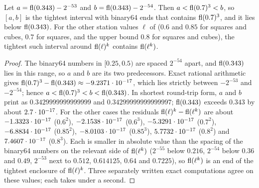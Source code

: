 \begin{lemma}\label{lem:scip-cube}
Let $a=\operatorname{fl}(0.343)-2^{-53}$ and $b=\operatorname{fl}(0.343)-2^{-54}$.
Then $a<\operatorname{fl}(0.7)^3<b$, so $[a,b]$ is the tightest interval with binary64 ends that contains $\operatorname{fl}(0.7)^3$, and it lies below $\operatorname{fl}(0.343)$.
For the other station values $\ell$ of  ($0.6$ and $0.85$ for squares and cubes, $0.7$ for squares, and the upper bound $0.8$ for squares and cubes), the tightest such interval around $\operatorname{fl}(\ell)^k$ contains $\operatorname{fl}(\ell^k)$.
\end{lemma}

\begin{proof}
The binary64 numbers in $[0.25,0.5)$ are spaced $2^{-54}$ apart, and $\operatorname{fl}(0.343)$ lies in this range, so $a$ and $b$ are its two predecessors.
Exact rational arithmetic gives $\operatorname{fl}(0.7)^3-\operatorname{fl}(0.343)\approx-9.2371\cdot 10^{-17}$, which lies strictly between $-2^{-53}$ and $-2^{-54}$; hence $a<\operatorname{fl}(0.7)^3<b<\operatorname{fl}(0.343)$.
In shortest round-trip form, $a$ and $b$ print as $0.3429999999999999$ and $0.34299999999999997$; $\operatorname{fl}(0.343)$ exceeds $0.343$ by about $2.7\cdot 10^{-17}$.
For the other cases the residuals $\operatorname{fl}(\ell)^k-\operatorname{fl}(\ell^k)$ are about $-1.3323\cdot 10^{-17}$ ($0.6^2$), $-2.1538\cdot 10^{-17}$ ($0.6^3$), $-5.3291\cdot 10^{-17}$ ($0.7^2$), $-6.8834\cdot 10^{-17}$ ($0.85^2$), $-8.0103\cdot 10^{-17}$ ($0.85^3$), $5.7732\cdot 10^{-17}$ ($0.8^2$) and $7.4607\cdot 10^{-17}$ ($0.8^3$).
Each is smaller in absolute value than the spacing of the binary64 numbers on the relevant side of $\operatorname{fl}(\ell^k)$ ($2^{-55}$ below $0.216$, $2^{-54}$ below $0.36$ and $0.49$, $2^{-53}$ next to $0.512$, $0.614125$, $0.64$ and $0.7225$), so $\operatorname{fl}(\ell^k)$ is an end of the tightest enclosure of $\operatorname{fl}(\ell)^k$.
Three separately written exact computations agree on these values; each takes under a second.
\end{proof}

\begin{certbox}
\end{certbox}

